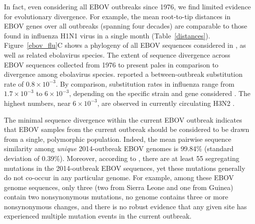 \documentclass[11pt]{article}
\begin{document}
In fact, even considering all EBOV outbreaks since 1976, we find limited evidence for evolutionary divergence. For example, the mean root-to-tip distances in EBOV genes over all outbreaks (spanning four decades) are comparable to those found in influenza H1N1 virus in a single month (Table~\ref{distances}). Figure~\ref{ebov_flu}C shows a phylogeny of all EBOV sequences considered in \citet{Gire2014}, as well as related ebolavirus species. The extent of sequence divergence across EBOV sequences collected from 1976 to present pales in comparison to divergence among ebolavirus species. \citet{Gire2014} reported a between-outbreak substitution rate of $0.8\times10^{-3}$. By comparison, substitution rates in influenza range from $1.7\times10^{-3}$ to $6\times10^{-3}$, depending on the specific strain and gene considered \citep{Rambautetal2008,Smithetal2009,Bedfordetal2010,Quetal2011,Rocheetal2014}. The highest numbers, near $6\times10^{-3}$, are observed in currently circulating H3N2 \citep{Rambautetal2008,Bedfordetal2010}.

The minimal sequence divergence within the current EBOV outbreak indicates that EBOV samples from the current outbreak should be considered to be drawn from a single, polymorphic population. Indeed, the mean pairwise sequence similarity among \emph{unique} 2014-outbreak EBOV genomes is 99.84\% (standard deviation of 0.39\%). Moreover, according to \citet{Gire2014}, there are at least 55 segregating mutations in the 2014-outbreak EBOV sequences, yet these mutations generally do not co-occur in any particular genome. For example, among these EBOV genome sequences, only three (two from Sierra Leone and one from Guinea) contain two nonsynonymous mutations, no genome contains three or more nonsynonymous changes, and there is no robust evidence that any given site has experienced multiple mutation events in the current outbreak.  
\end{document}
